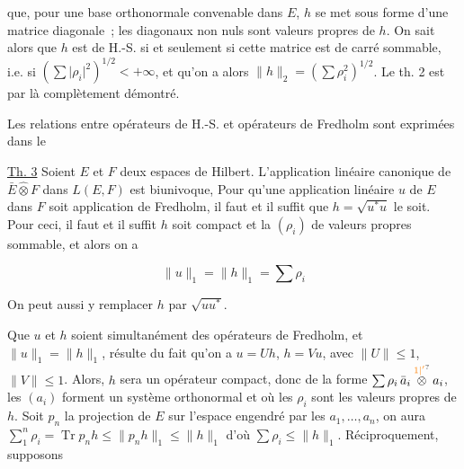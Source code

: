 que, pour une base orthonormale convenable dans $E$,
$h$ se met sous forme d'une matrice diagonale \,;
  les  diagonaux  non nuls sont
 valeurs propres  de $h$. On sait alors que $h$ est
de H.-S. si et seulement si cette matrice est
de carré sommable, i.e. si $(\sum\lvert\rho_i\rvert^2)^{1/2}<+\infty$, et
qu'on a alors $\|h\|_2=(\sum\rho_i^2)^{1/2}$. Le th. 2 est par là
complètement démontré.

Les relations entre opérateurs de H.-S. et opérateurs
de Fredholm sont exprimées dans le

\uline{Th. 3} Soient $E$ et $F$ deux espaces de Hilbert. L'application
linéaire canonique de $\bar E\widehat\otimes F$ dans $L(E,F)$ est biunivoque,
 Pour qu'une application linéaire $u$ de $E$ dans $F$
soit application de Fredholm, il faut et il suffit
que $h=\sqrt{u^*u}$ le soit.  Pour ceci, il faut et il suffit 
 $h$ soit compact et la  $(\rho_i)$ de  valeurs propres
 
sommable, et alors on a

\[
\|u\|_1=\|h\|_1=\sum\rho_i \tag*{(20)}
\]

On peut aussi y remplacer $h$ par $\sqrt{uu^*}$.


Que $u$ et $h$ soient simultanément des opérateurs
de Fredholm, et $\|u\|_1=\|h\|_1$, résulte du fait
qu'on a $u=Uh$, $h=Vu$, avec $\|U\|\leq1$, $\|V\|\leq1$.
  Alors, $h$ sera un opérateur compact, donc
 de la forme $\sum\rho_i\,\bar a_i\overset{\unsure{1|' }}{\otimes}a_i$, 
les $(a_i)$ forment un système orthonormal  et où les
$\rho_i$ sont les valeurs propres de $h$. Soit $p_n$ la
projection de $E$ sur l'espace engendré par les
$a_1,\ldots,a_n$, on aura $\sum_1^n\rho_i=\operatorname{Tr}p_nh\leq\|p_nh\|_1\leq\|h\|_1$
d'où $\sum\rho_i\leq\|h\|_1$. Réciproquement, supposons

